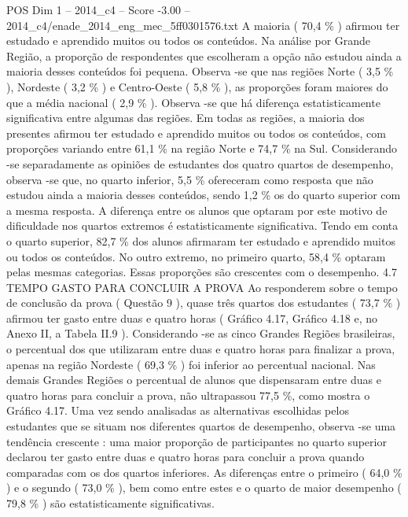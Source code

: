 \begin{textsample}{POS Dim 1 – 2014\_c4 – Score -3.00 – 2014\_c4/enade\_2014\_eng\_mec\_5ff0301576.txt}
A maioria ( 70,4 \% ) afirmou ter estudado e aprendido muitos ou todos os conteúdos.
Na análise por Grande Região, a proporção de respondentes que escolheram a opção não estudou ainda a maioria desses conteúdos foi pequena.
Observa -se que nas regiões Norte ( 3,5 \% ), Nordeste ( 3,2 \% ) e Centro-Oeste ( 5,8 \% ), as proporções foram maiores do que a média nacional ( 2,9 \% ).
Observa -se que há diferença estatisticamente significativa entre algumas das regiões.
Em todas as regiões, a maioria dos presentes afirmou ter estudado e aprendido muitos ou todos os conteúdos, com proporções variando entre 61,1 \% na região Norte e 74,7 \% na Sul.
Considerando -se separadamente as opiniões de estudantes dos quatro quartos de desempenho, observa -se que, no quarto inferior, 5,5 \% ofereceram como resposta que não estudou ainda a maioria desses conteúdos, sendo 1,2 \% os do quarto superior com a mesma resposta.
A diferença entre os alunos que optaram por este motivo de dificuldade nos quartos extremos é estatisticamente significativa.
Tendo em conta o quarto superior, 82,7 \% dos alunos afirmaram ter estudado e aprendido muitos ou todos os conteúdos.
No outro extremo, no primeiro quarto, 58,4 \% optaram pelas mesmas categorias.
Essas proporções são crescentes com o desempenho. 4.7 TEMPO GASTO PARA CONCLUIR A PROVA Ao responderem sobre o tempo de conclusão da prova ( Questão 9 ), quase três quartos dos estudantes ( 73,7 \% ) afirmou ter gasto entre duas e quatro horas ( Gráfico 4.17, Gráfico 4.18 e, no Anexo II, a Tabela II.9 ).
Considerando -se as cinco Grandes Regiões brasileiras, o percentual dos que utilizaram entre duas e quatro horas para finalizar a prova, apenas na região Nordeste ( 69,3 \% ) foi inferior ao percentual nacional.
Nas demais Grandes Regiões o percentual de alunos que dispensaram entre duas e quatro horas para concluir a prova, não ultrapassou 77,5 \%, como mostra o Gráfico 4.17.
Uma vez sendo analisadas as alternativas escolhidas pelos estudantes que se situam nos diferentes quartos de desempenho, observa -se uma tendência crescente : uma maior proporção de participantes no quarto superior declarou ter gasto entre duas e quatro horas para concluir a prova quando comparadas com os dos quartos inferiores.
As diferenças entre o primeiro ( 64,0 \% ) e o segundo ( 73,0 \% ), bem como entre estes e o quarto de maior desempenho ( 79,8 \% ) são estatisticamente significativas.

\end{textsample}
